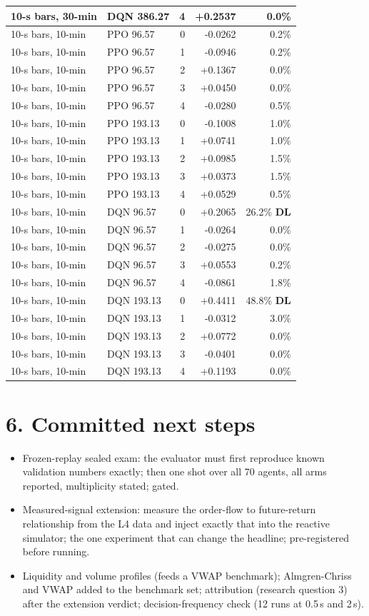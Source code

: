 \documentclass[11pt]{article}
\begin{document}
\begin{center}
\begin{longtable}{llrrr}
10-s bars, 30-min & DQN 386.27 & 4 & +0.2537 & 0.0\% \\
\midrule
10-s bars, 10-min & PPO 96.57 & 0 & -0.0262 & 0.2\% \\
10-s bars, 10-min & PPO 96.57 & 1 & -0.0946 & 0.2\% \\
10-s bars, 10-min & PPO 96.57 & 2 & +0.1367 & 0.0\% \\
10-s bars, 10-min & PPO 96.57 & 3 & +0.0450 & 0.0\% \\
10-s bars, 10-min & PPO 96.57 & 4 & -0.0280 & 0.5\% \\
10-s bars, 10-min & PPO 193.13 & 0 & -0.1008 & 1.0\% \\
10-s bars, 10-min & PPO 193.13 & 1 & +0.0741 & 1.0\% \\
10-s bars, 10-min & PPO 193.13 & 2 & +0.0985 & 1.5\% \\
10-s bars, 10-min & PPO 193.13 & 3 & +0.0373 & 1.5\% \\
10-s bars, 10-min & PPO 193.13 & 4 & +0.0529 & 0.5\% \\
10-s bars, 10-min & DQN 96.57 & 0 & +0.2065 & 26.2\% \textbf{DL} \\
10-s bars, 10-min & DQN 96.57 & 1 & -0.0264 & 0.0\% \\
10-s bars, 10-min & DQN 96.57 & 2 & -0.0275 & 0.0\% \\
10-s bars, 10-min & DQN 96.57 & 3 & +0.0553 & 0.2\% \\
10-s bars, 10-min & DQN 96.57 & 4 & -0.0861 & 1.8\% \\
10-s bars, 10-min & DQN 193.13 & 0 & +0.4411 & 48.8\% \textbf{DL} \\
10-s bars, 10-min & DQN 193.13 & 1 & -0.0312 & 3.0\% \\
10-s bars, 10-min & DQN 193.13 & 2 & +0.0772 & 0.0\% \\
10-s bars, 10-min & DQN 193.13 & 3 & -0.0401 & 0.0\% \\
10-s bars, 10-min & DQN 193.13 & 4 & +0.1193 & 0.0\% \\
\bottomrule
\end{longtable}\end{center}
\clearpage

\section*{6. Committed next steps}
\begin{itemize}
\item Frozen-replay sealed exam: the evaluator must first reproduce known validation numbers
exactly; then one shot over all 70 agents, all arms reported, multiplicity stated; gated.
\item Measured-signal extension: measure the order-flow to future-return relationship from
the L4 data and inject exactly that into the reactive simulator; the one experiment that can
change the headline; pre-registered before running.
\item Liquidity and volume profiles (feeds a VWAP benchmark); Almgren-Chriss and VWAP added
to the benchmark set; attribution (research question 3) after the extension verdict;
decision-frequency check (12 runs at 0.5\,s and 2\,s).
\end{itemize}
\end{document}

